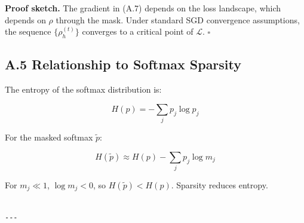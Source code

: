\textbf{Proof sketch.} The gradient in (A.7) depends on the loss landscape, which 
depends on $\rho$ through the mask. Under standard SGD convergence 
assumptions, the sequence $\{\rho_h^{(t)}\}$ converges to a critical point 
of $\mathcal{L}$. $\square$

\subsection{A.5 Relationship to Softmax Sparsity}

The entropy of the softmax distribution is:

\[
H(p) = -\sum_j p_j \log p_j
\]

For the masked softmax $\tilde{p}$:

\[
H(\tilde{p}) \approx H(p) - \sum_j p_j \log m_j
\]

For $m_j \ll 1$, $\log m_j < 0$, so $H(\tilde{p}) < H(p)$. Sparsity reduces 
entropy.
\begin{lstlisting}

---
\end{lstlisting}